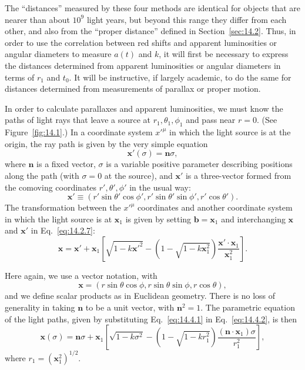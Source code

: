 The ``distances'' measured by these four methods are identical for objects
that are nearer than about \(10^9\) light years, but beyond this range they
differ from each other, and also from the ``proper distance'' defined in
Section~\ref{sec:14.2}. Thus, in order to use the correlation between red
shifts and apparent luminosities or angular diameters to measure \(a(t)\) and
\(k\), it will first be necessary to express the distances determined from
apparent luminosities or angular diameters in terms of \(r_1\) and \(t_0\).
It will be instructive, if largely academic, to do the same for distances
determined from measurements of parallax or proper motion.

In order to calculate parallaxes and apparent luminosities, we must know the
paths of light rays that leave a source at \(r_1,\theta_1,\phi_1\) and pass
near \(r=0\). (See Figure~\ref{fig:14.1}.) In a coordinate system
\(x'^\mu\) in which the light source is at the origin, the ray path is given
by the very simple equation
\begin{equation}
  \mathbf{x}'(\sigma)=\mathbf{n}\sigma,
  \tag{14.4.1}\label{eq:14.4.1}
\end{equation}
where \(\mathbf{n}\) is a fixed vector, \(\sigma\) is a variable positive
parameter describing positions along the path (with \(\sigma=0\) at the
source), and \(\mathbf{x}'\) is a three-vector formed from the comoving
coordinates \(r',\theta',\phi'\) in the usual way:
\[
  \mathbf{x}'
  \equiv
  \left(
    r'\sin\theta'\cos\phi',
    r'\sin\theta'\sin\phi',
    r'\cos\theta'
  \right).
\]
The transformation between the \(x'^\mu\) coordinates and another coordinate
system in which the light source is at \(\mathbf{x}_1\) is given by setting
\(\mathbf{b}=\mathbf{x}_1\) and interchanging \(\mathbf{x}\) and
\(\mathbf{x}'\) in Eq.~\eqref{eq:14.2.7}:
\begin{equation}
  \mathbf{x}
  =
  \mathbf{x}'
  +\mathbf{x}_1
  \left[
    \sqrt{1-k\mathbf{x}'^2}
    -
    \left(1-\sqrt{1-k\mathbf{x}_1^2}\right)
    \frac{\mathbf{x}'\cdot\mathbf{x}_1}{\mathbf{x}_1^2}
  \right].
  \tag{14.4.2}\label{eq:14.4.2}
\end{equation}



Here again, we use a vector notation, with
\[
  \mathbf{x}
  =
  \left(
    r\sin\theta\cos\phi,
    r\sin\theta\sin\phi,
    r\cos\theta
  \right),
\]
and we define scalar products as in Euclidean geometry. There is no loss of
generality in taking \(\mathbf{n}\) to be a unit vector, with
\(\mathbf{n}^2=1\). The parametric equation of the light paths, given by
substituting Eq.~\eqref{eq:14.4.1} in Eq.~\eqref{eq:14.4.2}, is then
\begin{equation}
  \mathbf{x}(\sigma)
  =
  \mathbf{n}\sigma
  +\mathbf{x}_1
  \left[
    \sqrt{1-k\sigma^2}
    -
    \left(1-\sqrt{1-kr_1^2}\right)
    \frac{(\mathbf{n}\cdot\mathbf{x}_1)\sigma}{r_1^2}
  \right],
  \tag{14.4.3}\label{eq:14.4.3}
\end{equation}
where \(r_1=(\mathbf{x}_1^2)^{1/2}\).

